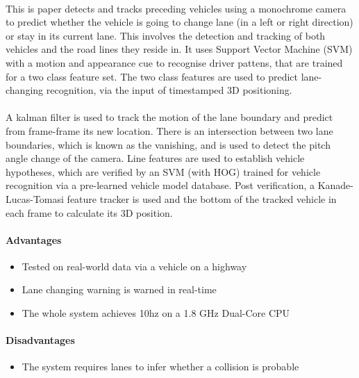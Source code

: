 \documentclass[a4paper]{report}
\begin{document}
{\paragraph {} This is paper \citep{multi-cue} detects and tracks preceding vehicles using a monochrome camera to predict whether the vehicle is going to change lane (in a left or right direction) or stay in its current lane. This involves the detection and tracking of both vehicles and the road lines they reside in. It uses Support Vector Machine (SVM) with a motion and appearance cue to recognise driver pattens, that are trained for a two class feature set. The two class features are used to predict lane-changing recognition, via the input of timestamped 3D positioning. 

\paragraph{}A kalman filter is used to track the motion of the lane boundary and predict from frame-frame its new location. There is an intersection between two lane boundaries, which is known as the vanishing, and is used to detect the pitch angle change of the camera. Line features are used to establish vehicle hypotheses, which are verified by an SVM (with HOG) trained for vehicle recognition via a pre-learned vehicle model database. Post verification, a Kanade-Lucas-Tomasi feature tracker is used and the bottom of the tracked vehicle in each frame to calculate its 3D position.
\paragraph{Advantages}
\begin{itemize}
\item Tested on real-world data via a vehicle on a highway
\item Lane changing warning is warned in real-time
\item The whole system achieves 10hz on a 1.8 GHz Dual-Core CPU
\end{itemize}

\paragraph{Disadvantages}
\begin{itemize}
\item The system requires lanes to infer whether a collision is probable	 	
\end{itemize}

}
\end{document}
